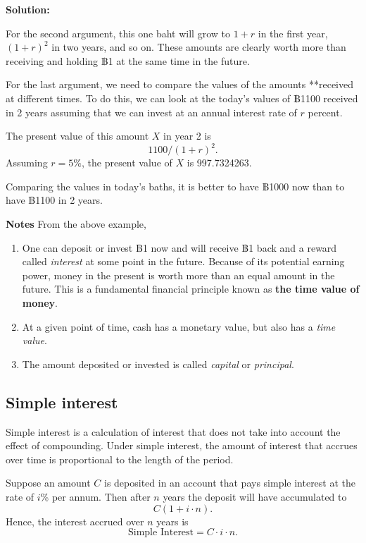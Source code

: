 \documentclass[
]{book}
\theoremstyle{definition}
\theoremstyle{definition}
\theoremstyle{definition}
\theoremstyle{definition}
\theoremstyle{remark}
\begin{document}
\textbf{Solution:}

For the second argument, this one baht will grow to \(1 + r\) in the first
year, \((1 + r)^2\) in two years, and so on. These amounts are clearly
worth more than receiving and holding ฿1 at the same time in the future.

For the last argument, we need to compare the values of the amounts
**received at different times. To do this, we can look at the today's
values of ฿1100 received in 2 years assuming that we can invest at an
annual interest rate of \(r\) percent.

The present value of this amount \(X\) in year 2 is \[ 1100/(1 + r)^2.\] Assuming \(r = 5\%\), the present value of \(X\) is 997.7324263.

Comparing the values in today's baths, it is better to
have ฿1000 now than to have ฿1100 in 2 years.

\textbf{Notes} From the above example,

\begin{enumerate}
\def\labelenumi{\arabic{enumi}.}
\item
  One can deposit or invest ฿1 now and will receive ฿1 back and a
  reward called \emph{interest} at some point in the future. Because of its
  potential earning power, money in the present is worth more than an
  equal amount in the future. This is a fundamental financial
  principle known as \textbf{the time value of money}.
\item
  At a given point of time, cash has a monetary value, but also has a
  \emph{time value}.
\item
  The amount deposited or invested is called \emph{capital} or \emph{principal}.
\end{enumerate}

\hypertarget{simple-interest}{%
\subsection{Simple interest}\label{simple-interest}}

Simple interest is a calculation of interest that does not take into
account the effect of compounding. Under simple interest, the amount of interest that accrues over time is proportional to the length of the period.

Suppose an amount \(C\) is deposited in
an account that pays simple interest at the rate of \(i\)\% per annum. Then
after \(n\) years the deposit will have accumulated to
\[C( 1 + i \cdot n).\] Hence, the interest accrued over \(n\) years is
\[\text{Simple Interest}  = C \cdot i \cdot n.\]
\end{document}
